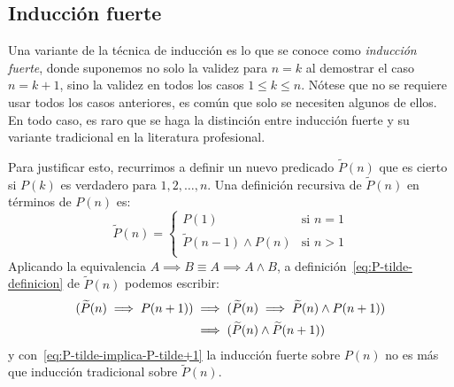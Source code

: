 \subsection{Inducción fuerte}
\label{sec:induccion-fuerte}

  Una variante de la técnica de inducción
  es lo que se conoce como \emph{inducción fuerte},
  donde suponemos no solo la validez para \(n = k\)
  al demostrar el caso \(n = k + 1\),
  sino la validez en todos los casos \(1 \le k \le n\).
  Nótese que no se requiere usar todos los casos anteriores,
  es común que solo se necesiten algunos de ellos.
  En todo caso,
  es raro que se haga la distinción
  entre inducción fuerte y su variante tradicional
  en la literatura profesional.

  Para justificar esto,
  recurrimos a definir un nuevo predicado \(\widetilde{P}(n)\)
  que es cierto si \(P(k)\) es verdadero para \(1, 2, \dotsc, n\).
  Una definición recursiva
  de \(\widetilde{P}(n)\) en términos de \(P(n)\) es:
  \begin{equation}
    \label{eq:P-tilde-definicion}
    \widetilde{P}(n)
     =
     \begin{cases}
       P(1)		     & \text{si \(n = 1\)} \\
       \widetilde{P}(n - 1) \wedge P(n) & \text{si \(n > 1\)} \\
     \end{cases}
  \end{equation}
  Aplicando la equivalencia
    \(A \implies B \equiv A \implies A \wedge B\),
  a definición~\eqref{eq:P-tilde-definicion} de \(\widetilde{P}(n)\)
  podemos escribir:
  \begin{align}
    (\widetilde{P}(n) \implies P(n + 1))
      &\implies
	 (\widetilde{P}(n)
	    \implies \widetilde{P}(n) \wedge P(n + 1))
      \notag \\
      &\implies
	 (\widetilde{P}(n) \wedge \widetilde{P}(n + 1))
      \label{eq:P-tilde-implica-P-tilde+1}
  \end{align}
  y con~\eqref{eq:P-tilde-implica-P-tilde+1}
  la inducción fuerte sobre \(P(n)\)
  no es más que inducción tradicional sobre \(\widetilde{P}(n)\).

